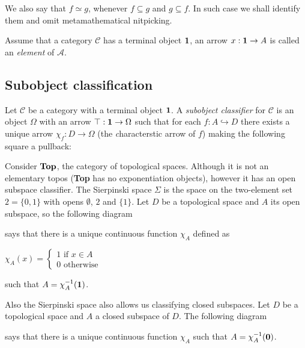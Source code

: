 \documentclass[a4paper]{article}
\theoremstyle{defin}
\theoremstyle{theorem}
\theoremstyle{claim}
\theoremstyle{prop}
\theoremstyle{lemma}
\theoremstyle{fact}
\theoremstyle{ex}
\theoremstyle{col}
\begin{document}
We also say that $f \simeq g$, whenever $f \subseteq g$ and $g \subseteq f$. In such case we shall identify them and omit metamathematical nitpicking.

Assume that a category $\mathcal{C}$ has a terminal object ${\bf 1}$, an arrow $x : {\bf 1} \to A$ is called an \emph{element} of $\mathcal{A}$.

\subsection{Subobject classification}

Let $\mathcal{C}$ be a category with a terminal object ${\bf 1}$. A \emph{subobject classifier} for $\mathcal{C}$ is an object $\Omega$ with an arrow $\top : {\bf 1} \to \Omega$ such that for each $f : A \hookrightarrow D$ there exists a unique arrow $\chi_f : D \to \Omega$ (the {\emph characterstic arrow} of $f$) making the following square a pullback:

\centerline{
}

Consider ${\bf Top}$, the category of topological spaces. Although it is not an elementary topos ({\bf Top} has no exponentiation objects), however it has an open subspace classifier.
The Sierpinski space $\Sigma$ is the space on the two-element set $2 = \{ 0, 1 \}$ with opens $\emptyset$, $2$ and $\{ 1 \}$. Let $D$ be a topological space and $A$ its open subspace, so the following diagram

\centerline{
}

says that there is a unique continuous function $\chi_A$ defined as
\begin{center}
$\chi_A(x) = \begin{cases} 1 \text{  if $x \in A$} \\ 0 \text{  otherwise} \end{cases} $
\end{center}
such that $A = \chi_A^{-1}({\bf 1})$.

Also the Sierpinski space also allows us classifying closed subspaces. Let $D$ be a topological space and $A$ a closed subspace of $D$. The following diagram

\centerline{
}
says that there is a unique continuous function $\chi_A$ such that $A = \chi_A^{-1}({\bf 0})$.
\end{document}
